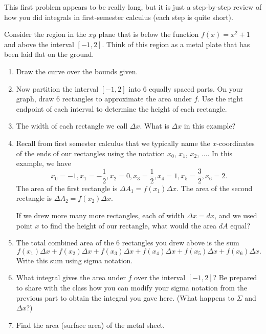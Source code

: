 This first problem appears to be really long, but it is just a step-by-step review of how you did integrals in first-semester calculus (each step is quite short).
\begin{problem}
 Consider the region in the $xy$ plane that is below the function $f(x)=x^2+1$ and above the interval $[-1,2]$.  Think of this region as a metal plate that has been laid flat on the ground.
\begin{enumerate}
 \item Draw the curve over the bounds given. 
 \item Now partition the interval $[-1,2]$ into 6 equally spaced parts. On your graph, draw 6 rectangles  to approximate the area under $f$.  Use the right endpoint of each interval to determine the height of each rectangle. 
 \item The width of each rectangle we call $\Delta x$. What is $\Delta x$ in this example?
 \item Recall from first semester calculus that we typically name the $x$-coordinates of the ends of our rectangles using the notation $x_0$, $x_1$, $x_2$, $\ldots$. In this example, we have 
$$
x_0=-1, 
x_1=-\frac{1}{2}, 
x_2=0, 
x_3=\frac{1}{2}, 
x_4=1, 
x_5=\frac{3}{2}, 
x_6=2.
$$
The area of the first rectangle is $\Delta A_1=f(x_1)\Delta x$. The area of the second rectangle is $\Delta A_2= f(x_2)\Delta x$. 

If we drew more many more rectangles, each of width $\Delta x=dx$, and we used point $x$ to find the height of our rectangle, what would the area $dA$ equal?

\item The total combined area of the 6 rectangles you drew above is the sum
$$
f(x_1)\Delta x+
f(x_2)\Delta x+
f(x_3)\Delta x+
f(x_4)\Delta x+
f(x_5)\Delta x+
f(x_6)\Delta x.
$$
Write this sum using sigma notation. 
\item What integral gives the area under $f$ over the interval $[-1,2]$? Be prepared to share with the class how you can modify your sigma notation from the previous part to obtain the integral you gave here. (What happens to $\Sigma$ and $\Delta x$?)
\item Find the area (surface area) of the metal sheet.
\end{enumerate}

\end{problem}

